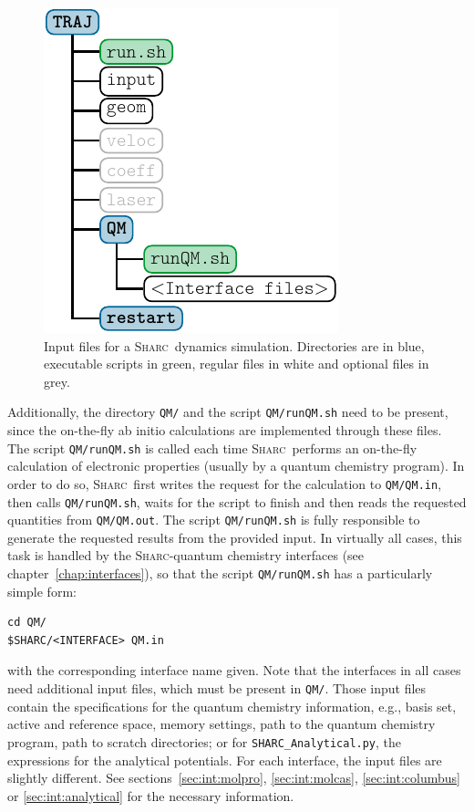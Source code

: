 \documentclass[a4paper,11pt,DIV=15,openany,twoside=false]{scrbook}
\newcommand{\sharc}{\textsc{Sharc}}
\newcommand{\ttt}[1]{\texttt{#1}}
\newenvironment{example}{
  \vspace{0mm}
  \definecolor{shadecolor}{HTML}{BBDDFF}
  \begin{shaded}
  \begin{minipage}{0.9\textwidth}
}{
  \end{minipage}
  \end{shaded}
}
\begin{document}
\begin{figure}[h!]
  \centering
  \includegraphics[scale=1]{img/dir_traj/dir_traj.pdf}
  \caption{Input files for a \sharc\ dynamics simulation. Directories are in blue, executable scripts in green, regular files in white and optional files in grey.}
  \label{fig:dir_traj}
\end{figure}

Additionally, the directory \ttt{QM/} and the script \ttt{QM/runQM.sh} need to be present, since the on-the-fly ab initio calculations are implemented through these files. The script \ttt{QM/runQM.sh} is called each time \sharc\ performs an on-the-fly calculation of electronic properties (usually by a quantum chemistry program). In order to do so, \sharc\ first writes the request for the calculation to \ttt{QM/QM.in}, then calls \ttt{QM/runQM.sh}, waits for the script to finish and then reads the requested quantities from \ttt{QM/QM.out}. The script \ttt{QM/runQM.sh} is fully responsible to generate the requested results from the provided input. 
In virtually all cases, this task is handled by the \sharc-quantum chemistry interfaces (see chapter~\ref{chap:interfaces}), so that the script \ttt{QM/runQM.sh} has a particularly simple form:
\begin{example}
  \begin{verbatim}
cd QM/
$SHARC/<INTERFACE> QM.in 
  \end{verbatim}
\end{example}
with the corresponding interface name given. Note that the interfaces in all cases need additional input files, which must be present in \ttt{QM/}. Those input files contain the specifications for the quantum chemistry information, e.g., basis set, active and reference space, memory settings, path to the quantum chemistry program, path to scratch directories; or for \ttt{SHARC\_Analytical.py}, the expressions for the analytical potentials. For each interface, the input files are slightly different. See sections~\ref{sec:int:molpro}, \ref{sec:int:molcas}, \ref{sec:int:columbus} or \ref{sec:int:analytical} for the necessary information.
\end{document}

